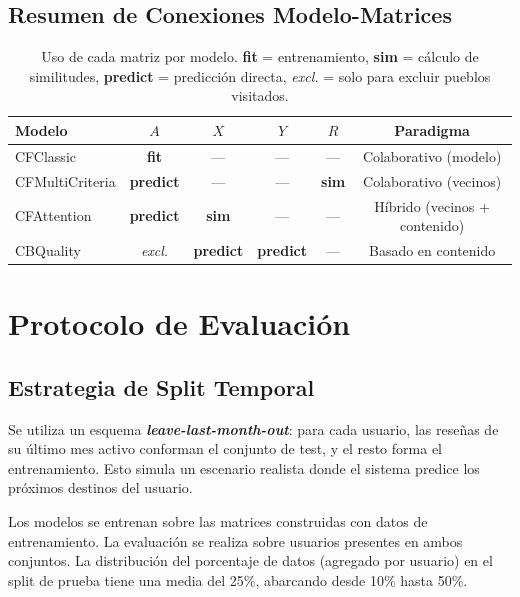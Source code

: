 \documentclass[11pt, a4paper]{article}
\begin{document}
\subsection{Resumen de Conexiones Modelo-Matrices}

\begin{table}[H]\centering
\begin{tabular}{lccccc}
\toprule
\textbf{Modelo} & $A$ & $X$ & $Y$ & $R$ & \textbf{Paradigma} \\
\midrule
CFClassic       & \textbf{fit}     & ---              & ---              & ---             & Colaborativo (modelo) \\
CFMultiCriteria & \textbf{predict} & ---              & ---              & \textbf{sim}    & Colaborativo (vecinos) \\
CFAttention     & \textbf{predict} & \textbf{sim}     & ---              & ---             & Híbrido (vecinos + contenido) \\
CBQuality       & \textit{excl.}   & \textbf{predict} & \textbf{predict} & ---             & Basado en contenido \\
\bottomrule
\end{tabular}
\caption{Uso de cada matriz por modelo. \textbf{fit} = entrenamiento, \textbf{sim} = cálculo de similitudes, \textbf{predict} = predicción directa, \textit{excl.} = solo para excluir pueblos visitados.}
\label{tab:modelo-matrices}
\end{table}


\section{Protocolo de Evaluación}

\subsection{Estrategia de Split Temporal}

Se utiliza un esquema \textbf{\textit{leave-last-month-out}}: para cada usuario, las reseñas de su último mes activo conforman el conjunto de test, y el resto forma el entrenamiento. Esto simula un escenario realista donde el sistema predice los próximos destinos del usuario.

Los modelos se entrenan sobre las matrices construidas con datos de entrenamiento. La evaluación se realiza sobre usuarios presentes en ambos conjuntos. La distribución del porcentaje de datos (agregado por usuario) en el split de prueba tiene una media del 25\%, abarcando desde 10\% hasta 50\%.
\end{document}
